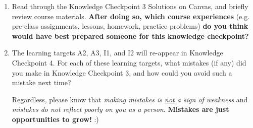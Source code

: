 \documentclass[10pt]{article}
\begin{document}
\begin{enumerate}

\item Read through the Knowledge Checkpoint 3 Solutions on Canvas, and briefly review course materials. {\bf After doing so, which course experiences} (e.g. pre-class assignments, lessons, homework, practice problems) {\bf do you think would have best prepared someone for this knowledge checkpoint?}

    \vfill

\item The learning targets A2, A3, I1, and I2 will re-appear in Knowledge Checkpoint 4. For each of these learning targets, what mistakes (if any) did you make in Knowledge Checkpoint 3, and how could you avoid such a mistake next time?

\vfill

\vfill

Regardless, please know that {\it making mistakes is \underline{not} a sign of weakness} and {\it mistakes do not reflect poorly on you as a person}. {\bf Mistakes are just opportunities to  grow!} :)







\end{enumerate}
\end{document}
